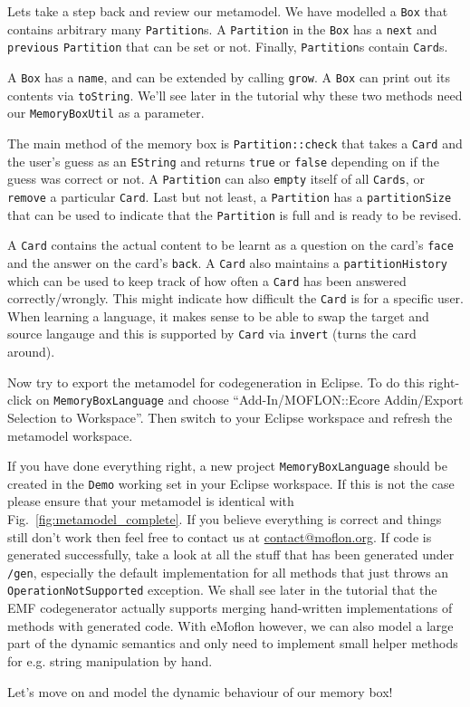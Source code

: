 Lets take a step back and review our metamodel.  We have modelled a \texttt{Box}
that contains arbitrary many \texttt{Partition}s.  A \texttt{Partition} in the
\texttt{Box} has a \texttt{next} and \texttt{previous} \texttt{Partition} that
can be set or not. Finally, \texttt{Partition}s contain \texttt{Card}s.

A \texttt{Box} has a \texttt{name}, and can be extended by calling
\texttt{grow}. A \texttt{Box} can print out its contents via \texttt{toString}. 
We'll see later in the tutorial why these two methods need our
\texttt{MemoryBoxUtil} as a parameter.

The main method of the memory box is \texttt{Partition::check} that takes a
\texttt{Card} and the user's guess as an \texttt{EString} and returns
\texttt{true} or \texttt{false} depending on if the guess was correct or not.
A \texttt{Partition} can also \texttt{empty} itself of all \texttt{Cards}, or
\texttt{remove} a particular \texttt{Card}.  Last but not least, a
\texttt{Partition} has a \texttt{partitionSize} that can be used to indicate
that the \texttt{Partition} is full and is ready to be revised.

\clearpage

A \texttt{Card} contains the actual content to be learnt as a question on the
card's \texttt{face} and the answer on the card's \texttt{back}. A \texttt{Card}
also maintains a \texttt{partition\-History} which can be used to keep track of
how often a \texttt{Card} has been answered correctly/wrongly.  This might
indicate how difficult the \texttt{Card} is for a specific user.
When learning a language, it makes sense to be able to swap the target and
source langauge and this is supported by \texttt{Card} via \texttt{invert}
(turns the card around).

Now try to export the metamodel for codegeneration in Eclipse.  To do this
right-click on \texttt{MemoryBoxLanguage} and choose ``Add-In/MOFLON::Ecore
Addin/Export Selection to Workspace''.  Then switch to your Eclipse workspace
and refresh the metamodel workspace.

If you have done everything right, a new project \texttt{MemoryBoxLanguage}
should be created in the \texttt{Demo} working set in your Eclipse workspace.
If this is not the case please ensure that your metamodel is identical with
Fig.~\ref{fig:metamodel_complete}.  If you believe everything is correct and
things still don't work then feel free to contact us at
\url{contact@moflon.org}.  If code is generated successfully, take a look at all
the stuff that has been generated under \texttt{/gen}, especially the default
implementation for all methods that just throws an
\texttt{OperationNotSupported} exception.  We shall see later in the tutorial
that the EMF codegenerator actually supports merging hand-written
implementations of methods with generated code.  With eMoflon however, we can
also model a large part of the dynamic semantics and only need to implement
small helper methods for e.g. string manipulation by hand.

Let's move on and model the dynamic behaviour of our memory box!